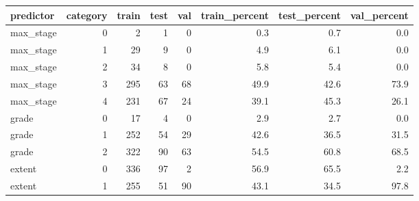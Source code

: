 \begin{tabular}{lrrrrrrr}
\toprule
predictor & category & train & test & val & train_percent & test_percent & val_percent \\
\midrule
max_stage & 0 & 2 & 1 & 0 & 0.3 & 0.7 & 0.0 \\
max_stage & 1 & 29 & 9 & 0 & 4.9 & 6.1 & 0.0 \\
max_stage & 2 & 34 & 8 & 0 & 5.8 & 5.4 & 0.0 \\
max_stage & 3 & 295 & 63 & 68 & 49.9 & 42.6 & 73.9 \\
max_stage & 4 & 231 & 67 & 24 & 39.1 & 45.3 & 26.1 \\
grade & 0 & 17 & 4 & 0 & 2.9 & 2.7 & 0.0 \\
grade & 1 & 252 & 54 & 29 & 42.6 & 36.5 & 31.5 \\
grade & 2 & 322 & 90 & 63 & 54.5 & 60.8 & 68.5 \\
extent & 0 & 336 & 97 & 2 & 56.9 & 65.5 & 2.2 \\
extent & 1 & 255 & 51 & 90 & 43.1 & 34.5 & 97.8 \\
\bottomrule
\end{tabular}
